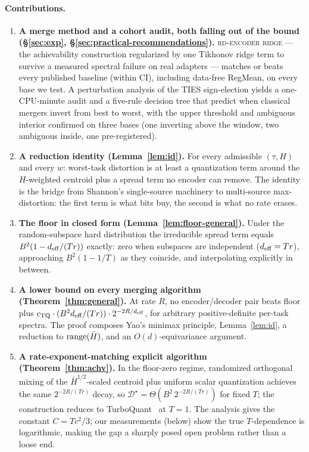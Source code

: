 \paragraph{Contributions.}
\begin{enumerate}[leftmargin=*,topsep=2pt,itemsep=2pt]
\item \textbf{A merge method and a cohort audit, both falling out of
the bound (\S\ref{sec:exp}, \S\ref{sec:practical-recommendations}).}
\textsc{rd-encoder ridge} --- the achievability construction
regularized by one Tikhonov ridge term to survive a measured spectral
failure on real adapters --- matches or beats every published baseline
(within CI), including data-free RegMean, on every base we test. A
perturbation analysis of the TIES sign-election
yields a one-CPU-minute audit and a five-rule decision tree that
predict when classical mergers invert from best to worst, with the
upper threshold and ambiguous interior confirmed on three bases (one
inverting above the window, two ambiguous inside, one pre-registered).

\item \textbf{A reduction identity (Lemma~\ref{lem:id}).} For every
admissible $(\tau, H)$ and every $w$: worst-task distortion is at
least a quantization term around the $H$-weighted centroid plus a
spread term no encoder can remove. The identity is the bridge from
Shannon's single-source machinery to multi-source max-distortion:
the first term is what bits buy, the second is what no rate erases.

\item \textbf{The floor in closed form (Lemma~\ref{lem:floor-general}).}
Under the random-subspace hard distribution the irreducible spread
term equals $B^2(1 - d_{\mathrm{eff}}/(Tr))$ exactly: zero when subspaces are
independent ($d_{\mathrm{eff}} = Tr$), approaching $B^2(1 - 1/T)$ as they
coincide, and interpolating explicitly in between.

\item \textbf{A lower bound on every merging algorithm
(Theorem~\ref{thm:general}).} At rate $R$, no encoder/decoder pair
beats floor plus $c_{\mathrm{TQ}} \cdot (B^2 d_{\mathrm{eff}} / (Tr)) \cdot
2^{-2R/d_{\mathrm{eff}}}$, for arbitrary positive-definite per-task spectra. The
proof composes Yao's minimax principle, Lemma~\ref{lem:id}, a
reduction to $\operatorname{range}(\bar H)$, and an $O(d)$-equivariance argument.

\item \textbf{A rate-exponent-matching explicit algorithm
(Theorem~\ref{thm:achv}).}
In the floor-zero regime, randomized orthogonal mixing of the
$\bar H^{1/2}$-scaled centroid plus uniform scalar quantization
achieves the same $2^{-2R/(Tr)}$ decay, so
$\mathcal{D}^\star = \Theta(B^2 \, 2^{-2R/(Tr)})$ for fixed $T$; the
construction reduces to TurboQuant~\cite{zandieh2025turboquant} at
$T = 1$. The analysis gives the constant $C = Tc^2/3$; our
measurements (below) show the true $T$-dependence is logarithmic,
making the gap a sharply posed open problem rather than a loose end.


\end{enumerate}

